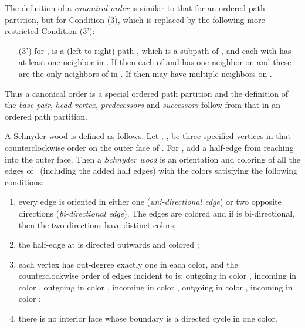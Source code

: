 \documentclass{article}
\newcommand{\df}{\textit}
\begin{document}
The definition of a \df{canonical order} is similar to that for an ordered path partition, but for Condition (3),
 which is replaced by the following more restricted Condition (3'):

\begin{enumerate}
	\item[(3')] for ,  is a (left-to-right) path , which is a
		subpath of ,
		and each  with  has at least one neighbor in .
If  then each of  and  has one neighbor on  and these are the only
		neighbors of  in .
		If  then  may have multiple neighbors on .
\end{enumerate}


Thus a canonical order is a special ordered path partition and the definition of the \df{base-pair},
 \df{head vertex}, \df{predecessors} and \df{successors} follow from that in an ordered path partition.


A Schnyder wood is defined as follows. Let , ,  be three specified vertices
in that counterclockwise order on the outer face of . For , add a half-edge from 
reaching into the outer face. Then a \df{Schnyder wood} is an orientation and coloring of all the edges of~
(including the added half edges) with the colors  satisfying the following conditions:

\begin{enumerate}[(1)]


	\item every edge  is oriented in either one (\df{uni-directional edge}) or two opposite directions
		(\df{bi-directional edge}). The edges are colored and if  is bi-directional, then the two
		directions have distinct colors;

	\item the half-edge at  is directed outwards and colored ;

	\item each vertex  has out-degree exactly one in each color, and the counterclockwise
		order of edges incident to  is: outgoing in color , incoming in color , outgoing
		in color , incoming in color , outgoing in color , incoming in color ;

	\item there is no interior face whose boundary is a directed cycle in one color.

\end{enumerate}
\end{document}

